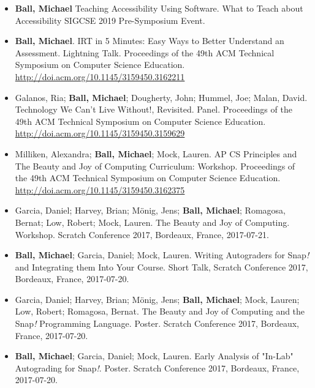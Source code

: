 \begin{itemize}
    \item{\textbf{Ball, Michael} Teaching Accessibility Using Software. What to Teach about Accessibility SIGCSE 2019 Pre-Symposium Event.}
    
    \item{\textbf{Ball, Michael}. IRT in 5 Minutes: Easy Ways to Better Understand an Assessment. Lightning Talk. Proceedings of the 49th ACM Technical Symposium on Computer Science Education.} \href{http://doi.acm.org/10.1145/3159450.3162211}{http://doi.acm.org/10.1145/3159450.3162211}

    \item{Galanos, Ria; \textbf{Ball, Michael}; Dougherty, John; Hummel, Joe; Malan, David. Technology We Can't Live Without!, Revisited. Panel. Proceedings of the 49th ACM Technical Symposium on Computer Science Education.} \href{http://doi.acm.org/10.1145/3159450.3159629}{http://doi.acm.org/10.1145/3159450.3159629}

    \item{Milliken, Alexandra; \textbf{Ball, Michael}; Mock, Lauren. AP CS Principles and The Beauty and Joy of Computing Curriculum: Workshop. Proceedings of the 49th ACM Technical Symposium on Computer Science Education.} \href{http://doi.acm.org/10.1145/3159450.3162375}{http://doi.acm.org/10.1145/3159450.3162375}

    
    \item{Garcia, Daniel; Harvey, Brian; Mönig, Jens; \textbf{Ball, Michael}; Romagosa, Bernat; Low, Robert; Mock, Lauren. The Beauty and Joy of Computing. Workshop. Scratch Conference 2017, Bordeaux, France, 2017-07-21.}

    \item{\textbf{Ball, Michael}; Garcia, Daniel; Mock, Lauren. Writing Autograders for Snap\textit{!} and Integrating them Into Your Course. Short Talk, Scratch Conference 2017, Bordeaux, France, 2017-07-20.}

    \item{Garcia, Daniel; Harvey, Brian; Mönig, Jens; \textbf{Ball, Michael}; Mock, Lauren; Low, Robert; Romagosa, Bernat. The Beauty and Joy of Computing and the Snap\textit{!} Programming Language. Poster. Scratch Conference 2017, Bordeaux, France, 2017-07-20.}

    \item{\textbf{Ball, Michael}; Garcia, Daniel; Mock, Lauren. Early Analysis of "In-Lab" Autograding for Snap\textit{!}. Poster. Scratch Conference 2017, Bordeaux, France, 2017-07-20.}


\end{itemize}
